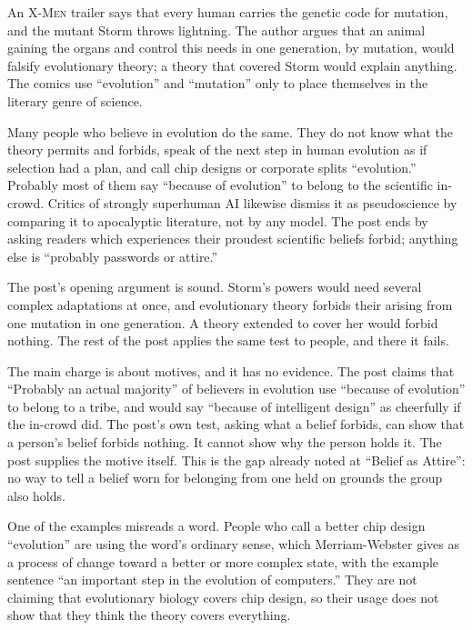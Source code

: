 \begin{afterword}
\summaryhead

An \textsc{X-Men} trailer says that every human carries the genetic code for mutation, and the mutant Storm throws lightning. The author argues that an animal gaining the organs and control this needs in one generation, by mutation, would falsify evolutionary theory; a theory that covered Storm would explain anything. The comics use ``evolution'' and ``mutation'' only to place themselves in the literary genre of science.

Many people who believe in evolution do the same. They do not know what the theory permits and forbids, speak of the next step in human evolution as if selection had a plan, and call chip designs or corporate splits ``evolution.'' Probably most of them say ``because of evolution'' to belong to the scientific in-crowd. Critics of strongly superhuman AI likewise dismiss it as pseudoscience by comparing it to apocalyptic literature, not by any model. The post ends by asking readers which experiences their proudest scientific beliefs forbid; anything else is ``probably passwords or attire.''

\responsehead

The post's opening argument is sound. Storm's powers would need several complex adaptations at once, and evolutionary theory forbids their arising from one mutation in one generation. A theory extended to cover her would forbid nothing. The rest of the post applies the same test to people, and there it fails.

The main charge is about motives, and it has no evidence. The post claims that ``Probably an actual majority'' of believers in evolution use ``because of evolution'' to belong to a tribe, and would say ``because of intelligent design'' as cheerfully if the in-crowd did. The post's own test, asking what a belief forbids, can show that a person's belief forbids nothing. It cannot show why the person holds it. The post supplies the motive itself. This is the gap already noted at ``Belief as Attire'': no way to tell a belief worn for belonging from one held on grounds the group also holds.

One of the examples misreads a word. People who call a better chip design ``evolution'' are using the word's ordinary sense, which Merriam-Webster gives as a process of change toward a better or more complex state, with the example sentence ``an important step in the evolution of computers.'' They are not claiming that evolutionary biology covers chip design, so their usage does not show that they think the theory covers everything.


\end{afterword}
